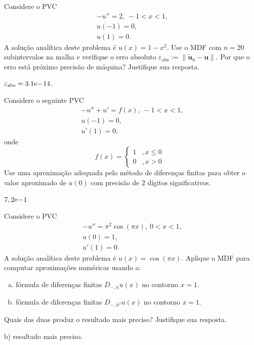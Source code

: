\begin{exer}
  Considere o PVC
  \begin{align}
    &-u'' = 2, ~-1 < x < 1,\\
    &u(-1) = 0,\\
    &u(1) = 0.
  \end{align}
  A solução analítica deste problema é $u(x) = 1-x^2$. Use o MDF com $n=20$ subintervalos na malha e verifique o erro absoluto $\varepsilon_{\text{abs}} := \|\tilde{\pmb{u}}_h - \pmb{u}\|$. Por que o erro está próximo precisão de máquina? Justifique sua resposta.
\end{exer}
\begin{resp}
  $\varepsilon_{\text{abs}} = 3.1\mathrm{e}\!-\!14$.
\end{resp}

\begin{exer}
Considere o seguinte PVC
\begin{subequations}
  \begin{align}
    &-u'' + u' = f(x), ~-1 < x < 1,\\
    &u(-1) = 0,\\
    &u'(1) =0,
  \end{align}
\end{subequations}
onde
\begin{equation}
  f(x) = \left\{
    \begin{array}{ll}
      1 &, x\leq 0\\
      0 &, x>0
    \end{array}
  \right.
\end{equation}
Use uma aproximação adequada pelo método de diferenças finitas para obter o valor aproximado de $u(0)$ com precisão de $2$ dígitos significativos.
\end{exer}
\begin{resp}
  $7,2\mathrm{e}\!-\!1$
\end{resp}

\begin{exer}
  Considere o PVC
  \begin{align}
    &-u'' = \pi^2\cos(\pi x), ~0 < x < 1,\\
    &u(0) = 1,\\
    &u'(1) = 0.
  \end{align}
  A solução analítica deste problema é $u(x) = \cos(\pi x)$. Aplique o MDF para computar aproximações numéricas usando a:
  \begin{enumerate}[a)]
  \item fórmula de diferenças finitas $D_{-,h}u(x)$ no contorno $x=1$.
  \item fórmula de diferenças finitas $D_{-,h^2}u(x)$ no contorno $x=1$.
  \end{enumerate}
  Quais das duas produz o resultado mais preciso? Justifique sua resposta.
\end{exer}
\begin{resp}
  b) resultado mais preciso.
\end{resp}

